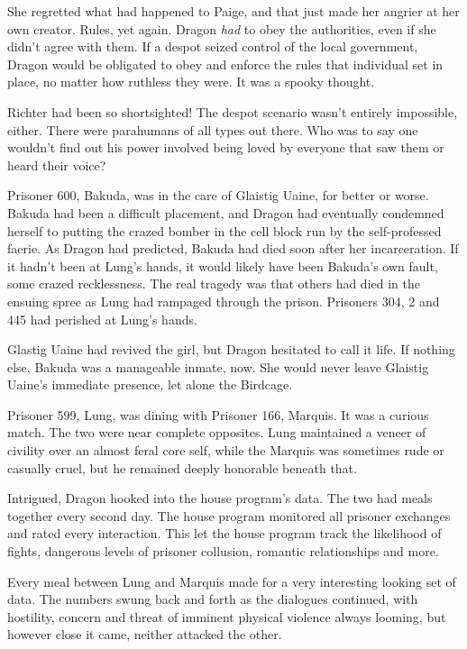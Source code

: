 She regretted what had happened to Paige, and that just made her angrier at her own creator.  Rules, yet again.  Dragon \emph{had} to obey the authorities, even if she didn't agree with them.  If a despot seized control of the local government, Dragon would be obligated to obey and enforce the rules that individual set in place, no matter how ruthless they were.  It was a spooky thought.



Richter had been so shortsighted!  The despot scenario wasn't entirely impossible, either.  There were parahumans of all types out there.  Who was to say one wouldn't find out his power involved being loved by everyone that saw them or heard their voice?



Prisoner 600, Bakuda, was in the care of Glaistig Uaine, for better or worse.  Bakuda had been a difficult placement, and Dragon had eventually condemned herself to putting the crazed bomber in the cell block run by the self-professed faerie.  As Dragon had predicted, Bakuda had died soon after her incarceration.  If it hadn't been at Lung's hands, it would likely have been Bakuda's own fault, some crazed recklessness.  The real tragedy was that others had died in the ensuing spree as Lung had rampaged through the prison.  Prisoners 304, 2 and 445 had perished at Lung's hands.



Glastig Uaine had revived the girl, but Dragon hesitated to call it life.  If nothing else, Bakuda was a manageable inmate, now.  She would never leave Glaistig Uaine's immediate presence, let alone the Birdcage.



Prisoner 599, Lung, was dining with Prisoner 166, Marquis.  It was a curious match.  The two were near complete opposites.  Lung maintained a veneer of civility over an almost feral core self, while the Marquis was sometimes rude or casually cruel, but he remained deeply honorable beneath that.



Intrigued, Dragon hooked into the house program's data.  The two had meals together every second day.  The house program monitored all prisoner exchanges and rated every interaction.  This let the house program track the likelihood of fights, dangerous levels of prisoner collusion, romantic relationships and more.



Every meal between Lung and Marquis made for a very interesting looking set of data.  The numbers swung back and forth as the dialogues continued, with hostility, concern and threat of imminent physical violence always looming, but however close it came, neither attacked the other.



